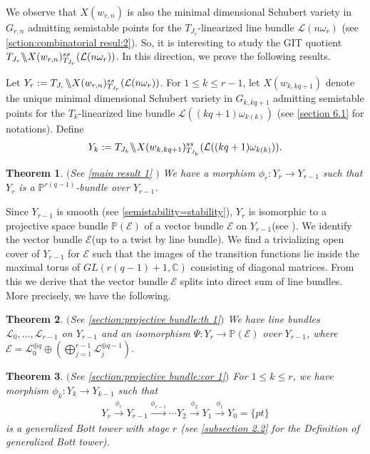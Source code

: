 \documentclass[12pt,reqno]{amsart}
\numberwithin{equation}{section}
\newtheorem{theorem}{Theorem}[section]
\theoremstyle{definition}
\newcommand{\GmodX}[3]{#1 \backslash\mkern-6mu\backslash #2^{ss}_{#1}(#3)}
\begin{document}
We observe that $X(w_{r,n})$ is also the minimal dimensional Schubert variety in $G_{r,n}$ admitting semistable points for the $T_{J_{r}}$-linearized line bundle $\mathcal{L}(n\omega_{r})$ (see \cref{sction:combinatorial resul:2}). So, it is interesting to study the GIT quotient $\GmodX{T_{J_{r}}}{X(w_{r,n})}{\mathcal{L}(n\omega_{r})}$. In this direction, we prove the following results.


Let $Y_{r}:=\GmodX{T_{J_{r}}}{X(w_{r,n})}{\mathcal{L}(n\omega_{r})}$. 
For $1\leq k\leq r-1$,  let $X(w_{k,kq+1})$ denote the unique minimal dimensional Schubert variety in $G_{k,kq+1}$ admitting semistable points for the $T_{k}$-linearized line bundle $\mathcal{L}((kq+1)\omega_{k(k)})$  (see \cref{section 6.1} for notations). Define\begin{align*}
	Y_{k}:=\GmodX{T_{J_{k}}}{X(w_{k,kq+1})}{\mathcal{L}((kq+1)\omega_{k(k)})}.
\end{align*}
\begin{theorem}$($See \cref{main result 1} $)$ We have a morphism $\phi_{r}:Y_{r}\longrightarrow Y_{r-1}$ such that 
$Y_{r}$ is a $\mathbb{P}^{r(q-1)}$-bundle over $Y_{r-1}$.
\end{theorem}
Since $Y_{r-1}$ is smooth (see \cref{semistability=stability}), $Y_{r}$ is isomorphic to a projective space bundle $\mathbb{P}(\mathcal{E})$ of a vector bundle $\mathcal{E}$ on $Y_{r-1}$(see \cite[Ch 2, Exercise 7.10(c)]{Ha}). We identify the vector bundle $\mathcal{E}$(up to a twist by line bundle). We find a trivializing open cover of $Y_{r-1}$ for $\mathcal{E}$ such that the images of the transition functions lie inside the maximal torus of $GL(r(q-1)+1,\mathbb{C})$ consisting of diagonal matrices. From this we derive that the vector bundle $\mathcal{E}$ splits into direct sum of line bundles. More precisely, we have the following.
\begin{theorem} $($See \cref{section:projective bundle:th 1}$)$
	We have line bundles $\mathcal{L}_{0},\ldots,\mathcal{L}_{r-1}$ on $Y_{r-1}$ and an isomorphism $\Psi:Y_{r}\longrightarrow \mathbb{P}(\mathcal{E})$ over $Y_{r-1}$, where $\mathcal{E}=\mathcal{L}_{0}^{\oplus q}\oplus(\bigoplus_{j=1}^{r-1} \mathcal{L}_{j}^{\oplus q-1})$.
\end{theorem}
\begin{theorem}$($See \cref{section:projective bundle:cor 1}$)$
	For $1\leq k\leq r$, we have morphism $\phi_{k}:Y_{k}\longrightarrow Y_{k-1}$ such that 
	\begin{align*}
		Y_{r}\xrightarrow{\text{$\phi_{r}$}}Y_{r-1}\xrightarrow{\text{$\phi_{r-1}$}}\cdots Y_{2}\xrightarrow{\text{$\phi_{2}$}}Y_{1}\xrightarrow{\text{$\phi_{1}$}}Y_{0}=\{pt\}
	\end{align*}
	is a generalized Bott tower with stage $r$ (see \cref{subsection 2.2} for the Definition of generalized Bott tower).
	\end{theorem}
\end{document}
